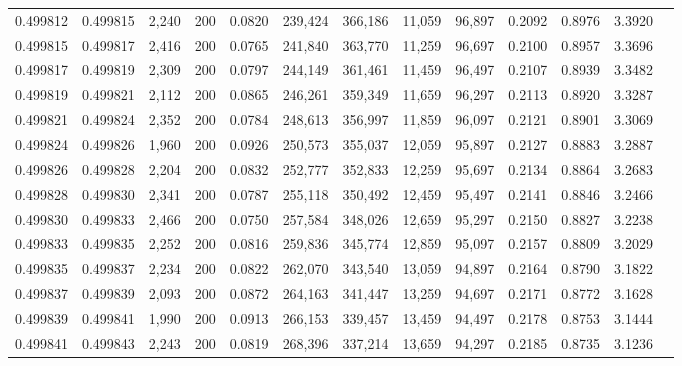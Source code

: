 \begin{tabular}{rrrrrrrrrrrrr}
0.499812 & 0.499815 &  2,240 & 200 &                                     0.0820 & 239,424 & 366,186 &  11,059 &  96,897 & 0.2092 & 0.8976 & 3.3920 \\
0.499815 & 0.499817 &  2,416 & 200 &                                     0.0765 & 241,840 & 363,770 &  11,259 &  96,697 & 0.2100 & 0.8957 & 3.3696 \\
0.499817 & 0.499819 &  2,309 & 200 &                                     0.0797 & 244,149 & 361,461 &  11,459 &  96,497 & 0.2107 & 0.8939 & 3.3482 \\
0.499819 & 0.499821 &  2,112 & 200 &                                     0.0865 & 246,261 & 359,349 &  11,659 &  96,297 & 0.2113 & 0.8920 & 3.3287 \\
0.499821 & 0.499824 &  2,352 & 200 &                                     0.0784 & 248,613 & 356,997 &  11,859 &  96,097 & 0.2121 & 0.8901 & 3.3069 \\
0.499824 & 0.499826 &  1,960 & 200 &                                     0.0926 & 250,573 & 355,037 &  12,059 &  95,897 & 0.2127 & 0.8883 & 3.2887 \\
0.499826 & 0.499828 &  2,204 & 200 &                                     0.0832 & 252,777 & 352,833 &  12,259 &  95,697 & 0.2134 & 0.8864 & 3.2683 \\
0.499828 & 0.499830 &  2,341 & 200 &                                     0.0787 & 255,118 & 350,492 &  12,459 &  95,497 & 0.2141 & 0.8846 & 3.2466 \\
0.499830 & 0.499833 &  2,466 & 200 &                                     0.0750 & 257,584 & 348,026 &  12,659 &  95,297 & 0.2150 & 0.8827 & 3.2238 \\
0.499833 & 0.499835 &  2,252 & 200 &                                     0.0816 & 259,836 & 345,774 &  12,859 &  95,097 & 0.2157 & 0.8809 & 3.2029 \\
0.499835 & 0.499837 &  2,234 & 200 &                                     0.0822 & 262,070 & 343,540 &  13,059 &  94,897 & 0.2164 & 0.8790 & 3.1822 \\
0.499837 & 0.499839 &  2,093 & 200 &                                     0.0872 & 264,163 & 341,447 &  13,259 &  94,697 & 0.2171 & 0.8772 & 3.1628 \\
0.499839 & 0.499841 &  1,990 & 200 &                                     0.0913 & 266,153 & 339,457 &  13,459 &  94,497 & 0.2178 & 0.8753 & 3.1444 \\
0.499841 & 0.499843 &  2,243 & 200 &                                     0.0819 & 268,396 & 337,214 &  13,659 &  94,297 & 0.2185 & 0.8735 & 3.1236 \\

\end{tabular}
